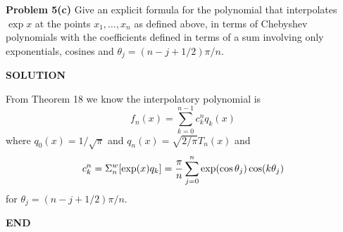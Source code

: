 \documentclass[12pt,a4paper]{article}
\begin{document}
\textbf{Problem 5(c)} Give an explicit formula for the polynomial that interpolates $\exp x$ at the points $x_1,\ensuremath{\ldots},x_n$ as defined above, in terms of Chebyshev polynomials with the coefficients defined in terms of a sum involving only exponentials, cosines and $\ensuremath{\theta}_j = (n-j+1/2)\ensuremath{\pi}/n$.

\textbf{SOLUTION}

From Theorem 18 we know the interpolatory polynomial is 
\[
f_n(x) = \ensuremath{\sum}_{k=0}^{n-1} c_k^n q_k(x)
\]
where $q_0(x) = 1/\sqrt{\ensuremath{\pi}}$ and $q_n(x) = \sqrt{2/\ensuremath{\pi}} T_n(x)$ and
\[
c_k^n = \ensuremath{\Sigma}_n^w[\exp(x) q_k] = {\ensuremath{\pi} \over n} \ensuremath{\sum}_{j=0}^n \exp( \cos \ensuremath{\theta}_j) \cos(k \ensuremath{\theta}_j)
\]
for $\ensuremath{\theta}_j = (n-j+1/2)\ensuremath{\pi}/n$.

\textbf{END}
\end{document}
